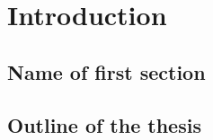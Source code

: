 \chapter{Introduction}
\label{chap: intro}
\setcounter{page}{1}


\vspace*{-2mm}
\section{Name of first section}
\label{sec: chap1 motivation}

\lipsum[9-13]

\section{Outline of the thesis}
\label{sec: chap1 outline}

\lipsum[10-12]


